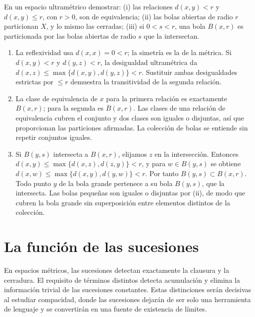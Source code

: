 \begin{ejercicio}
En un espacio ultramétrico demostrar: (i) las relaciones $d(x,y)<r$ y $d(x,y)\le r$, con $r>0$, son de equivalencia; (ii) las bolas abiertas de radio $r$ particionan $X$, y lo mismo las cerradas; (iii) si $0<s<r$, una bola $B(x,r)$ es particionada por las bolas abiertas de radio $s$ que la intersectan.
\end{ejercicio}
\begin{solucion}
\begin{enumerate}[label=(\roman*)]
\item La reflexividad usa $d(x,x)=0<r$; la simetría es la de la métrica. Si $d(x,y)<r$ y $d(y,z)<r$, la desigualdad ultramétrica da $d(x,z)\le\max\{d(x,y),d(y,z)\}<r$. Sustituir ambas desigualdades estrictas por $\le r$ demuestra la transitividad de la segunda relación.
\item La clase de equivalencia de $x$ para la primera relación es exactamente $B(x,r)$; para la segunda es $\overline B(x,r)$. Las clases de una relación de equivalencia cubren el conjunto y dos clases son iguales o disjuntas, así que proporcionan las particiones afirmadas. La colección de bolas se entiende sin repetir conjuntos iguales.
\item Si $B(y,s)$ intersecta a $B(x,r)$, elijamos $z$ en la intersección. Entonces $d(x,y)\le\max\{d(x,z),d(z,y)\}<r$, y para $w\in B(y,s)$ se obtiene $d(x,w)\le\max\{d(x,y),d(y,w)\}<r$. Por tanto $B(y,s)\subset B(x,r)$. Todo punto $y$ de la bola grande pertenece a su bola $B(y,s)$, que la intersecta. Las bolas pequeñas son iguales o disjuntas por (ii), de modo que cubren la bola grande sin superposición entre elementos distintos de la colección.
\end{enumerate}
\end{solucion}

\section{La función de las sucesiones}
En espacios métricos, las sucesiones detectan exactamente la clausura y la cerradura. El requisito de términos distintos detecta acumulación y elimina la información trivial de las sucesiones constantes. Estas distinciones serán decisivas al estudiar compacidad, donde las sucesiones dejarán de ser solo una herramienta de lenguaje y se convertirán en una fuente de existencia de límites.

